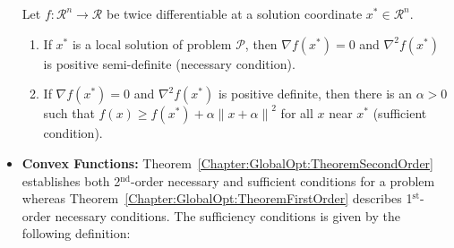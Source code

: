 \begin{itemize}
\begin{thm}\label{Chapter:GlobalOpt:TheoremSecondOrder}
Let $f:\mathcal{R}^{n}\rightarrow\mathcal{R}$ be twice differentiable at a solution coordinate $x^{\ast}\in\mathcal{R}^{n}$. 
   \begin{enumerate}
       \item If $x^{\ast}$ is a local solution of problem $\mathcal{P}$, then $\nabla f\left(x^{\ast}\right)=0$ and $\nabla^{2}f\left(x^{\ast}\right)$ is positive semi-definite (necessary condition).
       \item If $\nabla f\left(x^{\ast}\right)=0$ and $\nabla^{2}f\left(x^{\ast}\right)$ is positive definite, then there is an $\alpha > 0$ such that $f\left(x\right)\ge f\left(x^{\ast}\right)+\alpha\left\|x+\alpha\right\|^{2}$ for all $x$ near $x^{\ast}$ (sufficient condition).
   \end{enumerate}
\end{thm}

\item {\bf Convex Functions:} Theorem~\ref{Chapter:GlobalOpt:TheoremSecondOrder} establishes both 2$^{\text{nd}}$-order necessary and sufficient conditions for a problem whereas Theorem~\ref{Chapter:GlobalOpt:TheoremFirstOrder} describes 1$^{\text{st}}$-order necessary conditions. The sufficiency conditions is given by the following definition:


\end{itemize}
